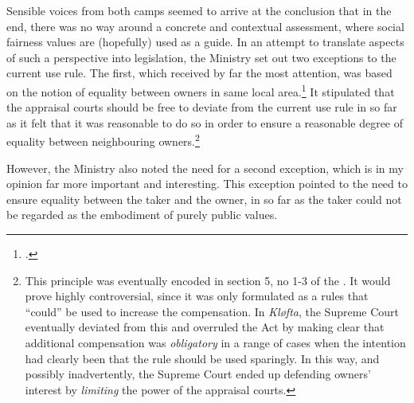 Sensible voices from both camps seemed to arrive at the conclusion that in the end, there was no way around a concrete and contextual assessment, where social fairness values are (hopefully) used as a guide. In an attempt to translate aspects of such a perspective into legislation, the Ministry set out two exceptions to the current use rule. The first, which received by far the most attention, was based on the notion of equality between owners in same local area.\footcite[19]{otprp70} It stipulated that the appraisal courts should be free to deviate from the current use rule in so far as it felt that it was reasonable to do so in order to ensure a reasonable degree of equality between neighbouring owners.\footnote{This principle was eventually encoded in section 5, no 1-3 of the \cite{ca73}. It would prove highly controversial, since it was only formulated as a rules that ``could'' be used to increase the compensation. In \emph{Kløfta}, the Supreme Court eventually deviated from this and overruled the Act by making clear that additional compensation was \emph{obligatory} in a range of cases when the intention had clearly been that the rule should be used sparingly. In this way, and possibly inadvertently, the Supreme Court ended up defending owners' interest by \emph{limiting} the power of the appraisal courts.}

However, the Ministry also noted the need for a second exception, which is in my opinion far more important and interesting. This exception pointed to the need to ensure equality between the taker and the owner, in so far as the taker could not be regarded as the embodiment of purely public values.

%
%

